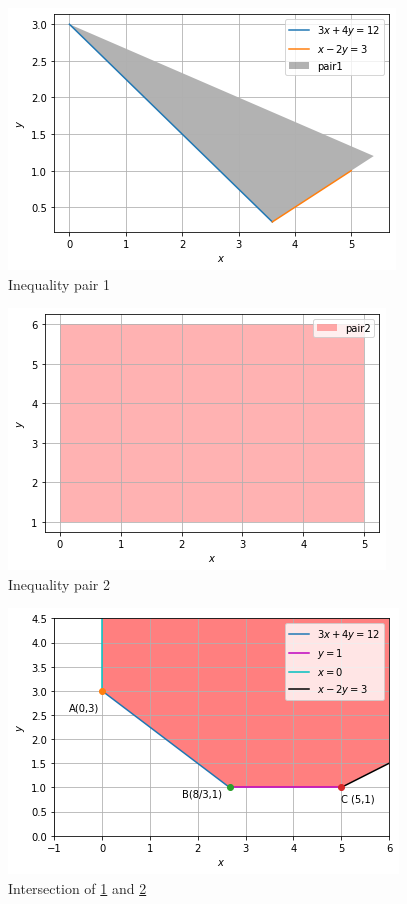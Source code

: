 \documentclass[journal,12pt,twocolumn]{IEEEtran}
\begin{document}
\begin{figure}[!ht]
\centering
\includegraphics[width=\columnwidth]{Figure9_1}
\caption{Inequality pair 1}
\label{fig:inequalities1}	
\end{figure}
\begin{figure}[!ht]
\centering
\includegraphics[width=\columnwidth]{Figure9_2}
\caption{Inequality pair 2}
\label{fig:inequalities2}	
\end{figure}
\begin{figure}[!ht]
\centering
\includegraphics[width=\columnwidth]{Figure9_3}
\caption{Intersection of \ref{fig:inequalities1} and \ref{fig:inequalities2}}
\label{fig:inequality3}	
\end{figure}
\end{document}
